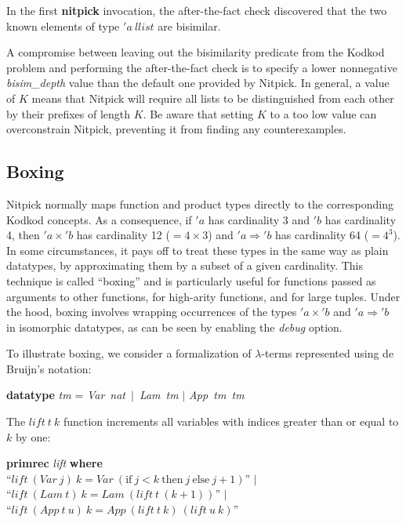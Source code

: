 \documentclass[a4paper,12pt]{article}
\begin{document}
In the first \textbf{nitpick} invocation, the after-the-fact check discovered 
that the two known elements of type $'a~\textit{llist}$ are bisimilar.

A compromise between leaving out the bisimilarity predicate from the Kodkod
problem and performing the after-the-fact check is to specify a lower
nonnegative \textit{bisim\_depth} value than the default one provided by
Nitpick. In general, a value of $K$ means that Nitpick will require all lists to
be distinguished from each other by their prefixes of length $K$. Be aware that
setting $K$ to a too low value can overconstrain Nitpick, preventing it from
finding any counterexamples.

\subsection{Boxing}
\label{boxing}

Nitpick normally maps function and product types directly to the corresponding
Kodkod concepts. As a consequence, if $'a$ has cardinality 3 and $'b$ has
cardinality 4, then $'a \times {'}b$ has cardinality 12 ($= 4 \times 3$) and $'a
\Rightarrow {'}b$ has cardinality 64 ($= 4^3$). In some circumstances, it pays
off to treat these types in the same way as plain datatypes, by approximating
them by a subset of a given cardinality. This technique is called ``boxing'' and
is particularly useful for functions passed as arguments to other functions, for
high-arity functions, and for large tuples. Under the hood, boxing involves
wrapping occurrences of the types $'a \times {'}b$ and $'a \Rightarrow {'}b$ in
isomorphic datatypes, as can be seen by enabling the \textit{debug} option.

To illustrate boxing, we consider a formalization of $\lambda$-terms represented
using de Bruijn's notation:

\prew
\textbf{datatype} \textit{tm} = \textit{Var}~\textit{nat}~$\mid$~\textit{Lam}~\textit{tm} $\mid$ \textit{App~tm~tm}
\postw

The $\textit{lift}~t~k$ function increments all variables with indices greater
than or equal to $k$ by one:

\prew
\textbf{primrec} \textit{lift} \textbf{where} \\
``$\textit{lift}~(\textit{Var}~j)~k = \textit{Var}~(\textrm{if}~j < k~\textrm{then}~j~\textrm{else}~j + 1)$'' $\mid$ \\
``$\textit{lift}~(\textit{Lam}~t)~k = \textit{Lam}~(\textit{lift}~t~(k + 1))$'' $\mid$ \\
``$\textit{lift}~(\textit{App}~t~u)~k = \textit{App}~(\textit{lift}~t~k)~(\textit{lift}~u~k)$''
\postw
\end{document}
